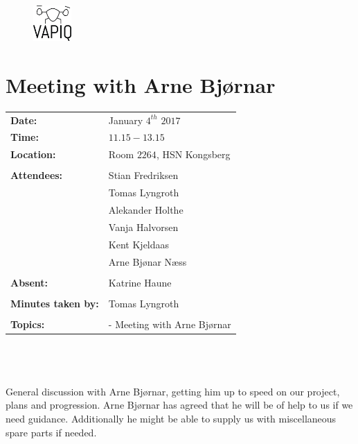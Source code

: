 \documentclass{article}
\begin{document}
\begin{figure}
\begin{center}
\includegraphics[width=0.13\textwidth]{VAPIQ-PICTURES/Logo2_Tilted.png} %
\advance{}
\end{center}
\end{figure}


\section*{Meeting with Arne Bjørnar}   %

\begin{tabular}{ll}            

\textbf{Date:} 	            & January $4^{th}$ $2017$	    \\
\textbf{Time:}	        	& $11.15-13.15$				    \\
\textbf{Location:}       	& Room $2264$, HSN Kongsberg    \\\\
\textbf{Attendees:}         & Stian Fredriksen			    \\
				        	& Tomas Lyngroth			    \\  
				        	& Alekander Holthe 		    	\\
				        	& Vanja Halvorsen		    	\\
				        	& Kent Kjeldaas                 \\
				        	& Arne Bjønar Næss                 \\\\
				        	
\textbf{Absent:}		    & Katrine Haune 		        \\\\
\textbf{Minutes taken by:}	& Tomas Lyngroth		        \\\\
\textbf{Topics:}	        & - Meeting with Arne Bjørnar \\
                           
\end{tabular}                                                       \\\\\\


General discussion with Arne Bjørnar, getting him up to speed on our project, plans and progression. Arne Bjørnar has agreed that he will be of help to us if we need guidance. Additionally he might be able to supply us with miscellaneous spare parts if needed.
\end{document}
